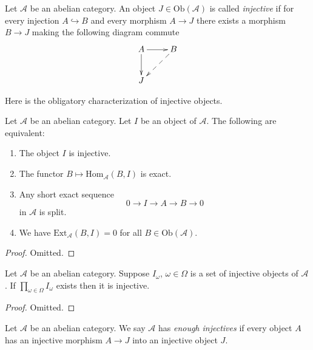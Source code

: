 \begin{definition}
\label{definition-injective}
Let $\mathcal{A}$ be an abelian category.
An object $J \in \text{Ob}(\mathcal{A})$ is
called {\it injective} if for every injection
$A \hookrightarrow B$ and every morphism
$A \to J$ there exists a morphism $B \to J$ making
the following diagram commute
$$
\xymatrix{
A \ar[r] \ar[d] & B \ar@{-->}[ld] \\
J &
}
$$
\end{definition}

\noindent
Here is the obligatory characterization of injective objects.

\begin{lemma}
\label{lemma-characterize-injectives}
Let $\mathcal{A}$ be an abelian category.
Let $I$ be an object of $\mathcal{A}$.
The following are equivalent:
\begin{enumerate}
\item The object $I$ is injective.
\item The functor $B \mapsto \text{Hom}_{\mathcal{A}}(B, I)$
is exact.
\item Any short exact sequence
$$
0 \to I \to A \to B \to 0
$$
in $\mathcal{A}$ is split.
\item We have $\text{Ext}_{\mathcal{A}}(B, I) = 0$ for
all $B \in \text{Ob}(\mathcal{A})$.
\end{enumerate}
\end{lemma}

\begin{proof}
Omitted.
\end{proof}

\begin{lemma}
\label{lemma-product-injectives}
Let $\mathcal{A}$ be an abelian category.
Suppose $I_\omega$, $\omega \in \Omega$ is a set of injective
objects of $\mathcal{A}$. If $\prod_{\omega \in \Omega} I_\omega$
exists then it is injective.
\end{lemma}

\begin{proof}
Omitted.
\end{proof}

\begin{definition}
\label{definition-enough-injectives}
Let $\mathcal{A}$ be an abelian category.
We say $\mathcal{A}$ has {\it enough injectives}
if every object $A$ has an injective morphism
$A \to J$ into an injective object $J$.
\end{definition}

